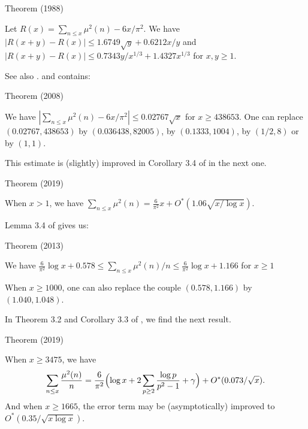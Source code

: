 \par 
\begin{thm}{Theorem (1988)}

  Let $R(x)=\sum_{n\le x}\mu^2(n)-6x/\pi^2$. We have
  $ |R(x+y)-R(x)|\le 1.6749\sqrt{y}+0.6212 x/y$ and 
  $ |R(x+y)-R(x)|\le 0.7343y/x^{1/3}+1.4327 x^{1/3}$ for $x,y\ge1$.
\end{thm}


See also \cite{CostaPereira*89}.
\cite{Moser-MacLeod*66} and 
\cite{Cohen-Dress-ElMarraki*07}
contains:
\par 
\begin{thm}{Theorem (2008)}

  We have
  $ |\sum_{n\le x}\mu^2(n)-6x/\pi^2|\le 0.02767\sqrt{x}$ for $x\ge 438653$.
  One can replace $(0.02767, 438653)$ by $(0.036438, 82005)$, by
  $(0.1333, 1004)$, by $(1/2, 8)$ or by $(1,1)$.
\end{thm}

This estimate is (slightly) improved in
Corollary 3.4 of
\cite{Ramare*18-9}
in the next one.

\par 
\begin{thm}{Theorem (2019)}

  When $x > 1$, we have
$\displaystyle
\sum_{n\le x}\mu^2(n)
=\frac{6}{\pi^2}x
+O^*(1.06\sqrt{x/\log x}).
  $
\end{thm}




\par 
Lemma 3.4
of  \cite{Ramare*13d}
gives us:
\par 
\begin{thm}{Theorem (2013)}

We have
$\frac{6}{\pi^2}\log x+0.578\le \sum_{n\le x}\mu^2(n)/n\le \frac{6}{\pi^2}\log x+1.166$ for $x\ge1$

When $x\ge1000$, one can also replace the couple $(0.578, 1.166)$ by $(1.040, 1.048)$.
\end{thm}

In Theorem 3.2 and Corollary 3.3 of
\cite{Ramare*18-9},
we find the next result.

\par 
\begin{thm}{Theorem (2019)}

  When $x \ge 3475$, we have
$$
\sum_{n\le x}\frac{\mu^2(n)}{n}
=\frac{6}{\pi^2}\Bigl(\log x+2\sum_{p\ge2}\frac{\log
p}{p^2-1}+\gamma\Bigr)
+O^*(0.073/\sqrt{x}).
  $$
  And when $x\ge 1665$, the error term may be (asymptotically) improved to
  $O^*(0.35/\sqrt{x\log x})$.
\end{thm}


